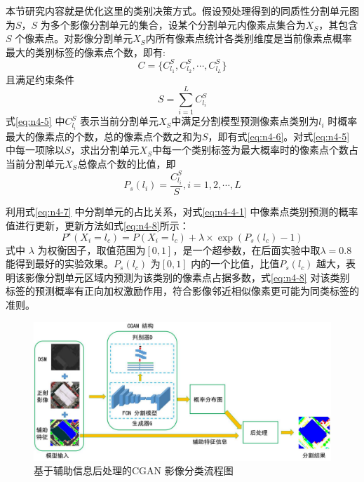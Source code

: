 本节研究内容就是优化这里的类别决策方式。假设预处理得到的同质性分割单元图为$S$，$S$ 为多个影像分割单元的集合，设某个分割单元内像素点集合为$X_S$，其包含$S$ 个像素点。对影像分割单元$X_S$内所有像素点统计各类别维度是当前像素点概率最大的类别标签的像素点个数，即有:
\begin{equation}\label{eq:n4-5}
    C = \{C^S_{l_1},C^S_{l_2}, \cdots, C^S_{l_L}\}
\end{equation}
且满足约束条件
\begin{equation}\label{eq:n4-6}
    S  = \sum _{i = 1}^L C^S_{l_i}
\end{equation}
式\ref{eq:n4-5} 中$C^S_{l_i}$ 表示当前分割单元$X_S$中满足分割模型预测像素点类别为$l_i$ 时概率最大的像素点的个数，总的像素点个数之和为$S$，即有式\ref{eq:n4-6}。对式\ref{eq:n4-5} 中每一项除以$S$，求出分割单元$X_S$中每一个类别标签为最大概率时的像素点个数占当前分割单元$X_S$总像点个数的比值，即
\begin{equation}\label{eq:n4-7}
    P_s(l_i) = \frac{C^S_{l_i}}{S},i=1,2,\cdots,L
\end{equation}

利用式\ref{eq:n4-7} 中分割单元的占比关系，对式\ref{eq:n4-4-1} 中像素点类别预测的概率值进行更新，更新方法如式\ref{eq:n4-8}所示：
\begin{equation}\label{eq:n4-8}
    P^{\star}(X_i=l_c) =  P(X_i=l_c) + \lambda \times \exp{(P_s(l_c)-1)}
\end{equation}
式中 $\lambda$ 为权衡因子，取值范围为$[0,1]$，是一个超参数，在后面实验中取$\lambda=0.8$ 能得到最好的实验效果。$P_s(l_c)$ 为$[0,1]$ 内的一个比值，比值$P_s(l_c)$ 越大，表明该影像分割单元区域内预测为该类别的像素点占据多数，式\ref{eq:n4-8} 对该类别标签的预测概率有正向加权激励作用，符合影像邻近相似像素更可能为同类标签的准则。


\begin{figure}[htbp]
    \centering
    \includegraphics[width=1.0\textwidth]{figures/cgan_post}
    \caption{基于辅助信息后处理的CGAN 影像分类流程图 }\label{fig:cgan_post}
\end{figure}

